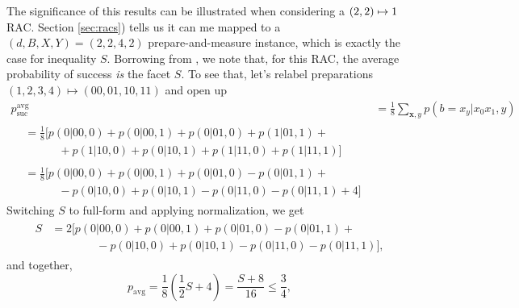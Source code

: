             The significance of this results can be illustrated when considering a $\left( 2, 2 \right) \mapsto 1$ RAC. Section \ref{sec:racs}) tells us it can me mapped to a $(d,B,X,Y) = (2,2,4,2)$ prepare-and-measure instance, which is exactly the case for inequality $S$. Borrowing from \cite{pawlowski_pamqkd_2011}, we note that, for this RAC, the average probability of success \emph{is} the facet $S$. To see that, let's relabel preparations $\left( 1, 2, 3, 4 \right) \mapsto \left(00, 01, 10, 11\right)$ and open up
            \begin{align*}
                        p_{\text{suc}}^{\text{avg}} &= \frac{1}{8} \sum_{\mathbf{x}, y} p(b = x_y \vert x_0 x_1, y) \\
                        \begin{split}
                            &= \frac{1}{8} \big[ p(0 \vert 00, 0) + p(0 \vert 00, 1) + p(0 \vert 01, 0) + p(1 \vert 01, 1) + \\
                            &\quad\qquad + p(1 \vert 10, 0) + p(0 \vert 10, 1) + p(1 \vert 11, 0) + p(1 \vert 11, 1) \big]
                        \end{split}
                        \\
                        \begin{split}
                            &= \frac{1}{8} \big[ p(0 \vert 00, 0) + p(0 \vert 00, 1) + p(0 \vert 01, 0) - p(0 \vert 01, 1) + \\
                            &\quad\qquad - p(0 \vert 10, 0) + p(0 \vert 10, 1) - p(0 \vert 11, 0) - p(0 \vert 11, 1) + 4 \big]
                        \end{split}
            \end{align*}
            Switching $S$ to full-form and applying normalization, we get
            \begin{align*}
            \begin{split}
                S &= 2 \big[ p(0 \vert 00, 0) + p(0 \vert 00, 1) + p(0 \vert 01, 0) - p(0 \vert 01, 1) + \\
                &\qquad\qquad - p(0 \vert 10, 0) + p(0 \vert 10, 1) - p(0 \vert 11, 0) - p(0 \vert 11, 1) \big] ,
            \end{split}
            \end{align*}
            and together,
            \begin{equation}
                p_{\text{avg}} = \frac{1}{8} \left( \frac{1}{2} S + 4 \right) = \frac{S + 8}{16} \leq \frac{3}{4} ,
                \label{eq:s-vs-pavg}
            \end{equation}
